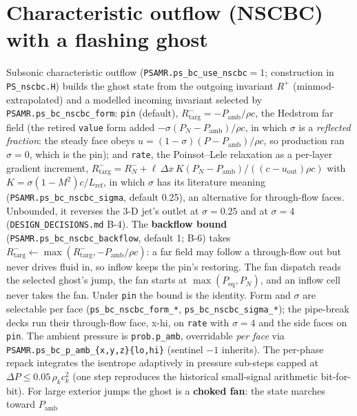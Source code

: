 \documentclass[11pt,a4paper]{article}
\newcommand{\code}[1]{\texttt{\small #1}}
\begin{document}
\section{Characteristic outflow (NSCBC) with a flashing ghost}
\label{sec:nscbc}

Subsonic characteristic outflow (\code{PSAMR.ps\_bc\_use\_nscbc}$=1$;
construction in \code{PS\_nscbc.H}) builds the ghost state from the
outgoing invariant $R^+$ (minmod-extrapolated) and a modelled incoming
invariant selected by \code{PSAMR.ps\_bc\_nscbc\_form}: \code{pin}
(default), $R^-_{\mathrm{targ}}=-P_{\mathrm{amb}}/\rho c$, the Hedstrom
far field (the retired \code{value} form added $-\sigma(P_N-P_{\mathrm{amb}})/\rho c$,
in which $\sigma$ is a \emph{reflected fraction}: the steady face obeys
$u=(1-\sigma)(P-P_{\mathrm{amb}})/\rho c$, so production ran $\sigma=0$,
which is the pin); and \code{rate}, the
Poinsot--Lele relaxation as a per-layer gradient increment,
$R^-_{\mathrm{targ}}=R^-_N+\ell\,\Delta x\,K(P_N-P_{\mathrm{amb}})
/((c-u_{\mathrm{out}})\rho c)$ with $K=\sigma(1-M^2)c/L_{\mathrm{ref}}$,
in which $\sigma$ has its literature meaning
(\code{PSAMR.ps\_bc\_nscbc\_sigma}, default 0.25), an alternative for
through-flow faces.  Unbounded, it reverses the 3-D jet's outlet at
$\sigma=0.25$ and at $\sigma=4$ (\code{DESIGN\_DECISIONS.md} B-4).  The
\textbf{backflow bound} (\code{PSAMR.ps\_bc\_nscbc\_backflow}, default 1;
B-6) takes $R^-_{\mathrm{targ}}\leftarrow\max(R^-_{\mathrm{targ}},
-P_{\mathrm{amb}}/\rho c)$: a far field may follow a through-flow out but
never drives fluid in, so inflow keeps the pin's restoring.  The fan
dispatch reads the selected ghost's jump, the fan starts at
$\max(P_{\mathrm{eq}},P_N)$, and an inflow cell never takes the fan.
Under \code{pin} the bound is the identity.  Form and $\sigma$ are
selectable per face (\code{ps\_bc\_nscbc\_form\_*},
\code{ps\_bc\_nscbc\_sigma\_*}); the pipe-break decks run their
through-flow face, x-hi, on \code{rate} with $\sigma=4$ and the side
faces on \code{pin}.  The ambient pressure is \code{prob.p\_amb}, overridable
\emph{per face} via \code{PSAMR.ps\_bc\_p\_amb\_\{x,y,z\}\{lo,hi\}}
(sentinel $-1$ inherits).  The per-phase repack integrates the isentrope
adaptively in pressure sub-steps capped at
$\Delta P \le 0.05\,\rho_k c_k^2$ (one step reproduces the historical
small-signal arithmetic bit-for-bit).  For large exterior jumps the ghost
is a \textbf{choked fan}: the state marches toward $P_{\mathrm{amb}}$
\end{document}
